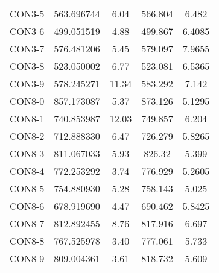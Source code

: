 \begin{table}[ht]
\begin{tabular}{c c c c c}
CON3-5 & 563.696744 & 6.04 & 566.804 & 6.482 \\
CON3-6 & 499.051519 & 4.88 & 499.867 & 6.4085 \\
CON3-7 & 576.481206 & 5.45 & 579.097 & 7.9655 \\
CON3-8 & 523.050002 & 6.77 & 523.081 & 6.5365 \\
CON3-9 & 578.245271 & 11.34 & 583.292 & 7.142 \\
CON8-0 & 857.173087 & 5.37 & 873.126 & 5.1295 \\
CON8-1 & 740.853987 & 12.03 & 749.857 & 6.204 \\
CON8-2 & 712.888330 & 6.47 & 726.279 & 5.8265 \\
CON8-3 & 811.067033 & 5.93 & 826.32 & 5.399 \\
CON8-4 & 772.253292 & 3.74 & 776.929 & 5.2605 \\
CON8-5 & 754.880930 & 5.28 & 758.143 & 5.025 \\
CON8-6 & 678.919690 & 4.47 & 690.462 & 5.8425 \\
CON8-7 & 812.892455 & 8.76 & 817.916 & 6.697 \\
CON8-8 & 767.525978 & 3.40 & 777.061 & 5.733 \\
CON8-9 & 809.004361 & 3.61 & 818.732 & 5.609 \\
[1ex]\hline
\end{tabular}
\label{table:nonlin}
\end{table} \clearpage
